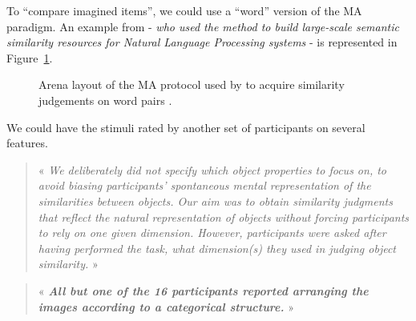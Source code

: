 \documentclass[
  authoryear]{elsarticle}
\begin{document}
To ``compare imagined items'', we could use a ``word'' version of the MA
paradigm. An example from
\citet{majewskaSpatialMultiarrangementClustering2020} - \emph{who used
the method to build large-scale semantic similarity resources for
Natural Language Processing systems} - is represented in
Figure~\ref{fig-majewska}.

\begin{figure}


\caption{\label{fig-majewska}Arena layout of the MA protocol used by to
acquire similarity judgements on word pairs \citep[figure
from][]{majewskaSpatialMultiarrangementClustering2020}.}

\end{figure}%

We could have the stimuli rated by another set of participants on
several features.

\begin{quote}
« \emph{We deliberately did not specify which object properties to focus
on, to avoid biasing participants' spontaneous mental representation of
the similarities between objects. Our aim was to obtain similarity
judgments that reflect the natural representation of objects without
forcing participants to rely on one given dimension. However,
participants were asked after having performed the task, what
dimension(s) they used in judging object similarity.} »
\citep{jozwik2016}
\end{quote}

\begin{quote}
« \textbf{\emph{All but one of the 16 participants reported arranging
the images according to a categorical structure.}} » \citep{jozwik2017}
\end{quote}
\end{document}
